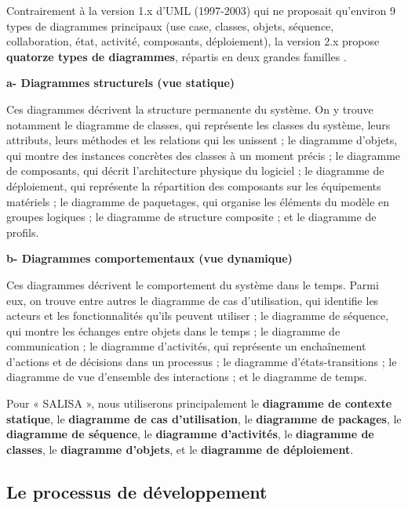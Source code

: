 Contrairement à la version 1.x d'UML (1997-2003) qui ne proposait qu'environ 9 types de diagrammes principaux (use case, classes, objets, séquence, collaboration, état, activité, composants, déploiement), la version 2.x propose \textbf{quatorze types de diagrammes}, répartis en deux grandes familles \cite{booch_uml}.

\vspace{0.3cm}
\noindent\textbf{\textcolor{vertCongo}{a- Diagrammes structurels (vue statique)}}

\vspace{0.2cm}
Ces diagrammes décrivent la structure permanente du système. On y trouve notamment le diagramme de classes, qui représente les classes du système, leurs attributs, leurs méthodes et les relations qui les unissent ; le diagramme d'objets, qui montre des instances concrètes des classes à un moment précis ; le diagramme de composants, qui décrit l'architecture physique du logiciel ; le diagramme de déploiement, qui représente la répartition des composants sur les équipements matériels ; le diagramme de paquetages, qui organise les éléments du modèle en groupes logiques ; le diagramme de structure composite ; et le diagramme de profils.

\vspace{0.3cm}
\noindent\textbf{\textcolor{vertCongo}{b- Diagrammes comportementaux (vue dynamique)}}

\vspace{0.2cm}
Ces diagrammes décrivent le comportement du système dans le temps. Parmi eux, on trouve entre autres le diagramme de cas d'utilisation, qui identifie les acteurs et les fonctionnalités qu'ils peuvent utiliser ; le diagramme de séquence, qui montre les échanges entre objets dans le temps ; le diagramme de communication ; le diagramme d'activités, qui représente un enchaînement d'actions et de décisions dans un processus ; le diagramme d'états-transitions ; le diagramme de vue d'ensemble des interactions ; et le diagramme de temps.

Pour « SALISA », nous utiliserons principalement le \textbf{diagramme de contexte statique}, le \textbf{diagramme de cas d'utilisation}, le \textbf{diagramme de packages}, le \textbf{diagramme de séquence}, le \textbf{diagramme d'activités}, le \textbf{diagramme de classes}, le \textbf{diagramme d'objets}, et le \textbf{diagramme de déploiement}.

\subsection{Le processus de développement}

